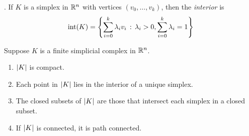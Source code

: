 \begin{definition}.
    If $K$ is a simplex in $\mathbb{R}^n$ with vertices $(v_0, \ldots, v_k)$, then the \emph{interior} is
    \[ \text{int}(K) = \left\{\sum_{i = 0}^{k} \lambda_iv_i \, :\, \lambda_i > 0, \sum_{i = 0}^{k} \lambda_i = 1\right\} \]
\end{definition}

\begin{lemma}
    Suppose $K$ is a finite simplicial complex in $\mathbb{R}^n$.
    \begin{enumerate}
        \item $\left\lvert {K} \right\rvert$ is compact.
        \item Each point in $\left\lvert {K} \right\rvert$ lies in the interior of a unique simplex.
        \item The closed subsets of $\left\lvert {K} \right\rvert$ are those that intersect each simplex in a closed subset.
        \item If $\left\lvert {K} \right\rvert$ is connected, it is path connected.
    \end{enumerate}
\end{lemma}
